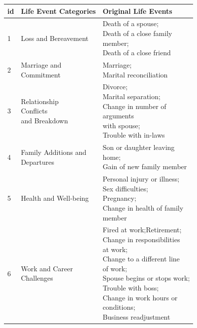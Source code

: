 \begin{table}[th]
    \small
    \centering
    \begin{tabular}{m{0.2cm}m{2.8cm}m{3.5cm}}
    \hline
    id & Life Event Categories & Original Life Events  \\ 
    \hline
    1 & Loss and Bereavement  &    \makecell[l]{Death of a spouse;\\Death of a close family \\member;\\Death of a close friend} \\ \hline
    2 & \makecell[l]{Marriage and \\Commitment}  &  \makecell[l]{Marriage;\\Marital reconciliation}   \\ \hline
    3 & \makecell[l]{Relationship \\ Conflicts \\and Breakdown}  &   \makecell[l]{Divorce;\\Marital separation;\\Change in number of\\ arguments \\with spouse;\\Trouble with in-laws}  \\ \hline
    4 & \makecell[l]{Family Additions and \\Departures}  &  \makecell[l]{Son or daughter leaving\\ home;\\Gain of new family member} \\ \hline
    5 & Health and Well-being  &  \makecell[l]{Personal injury or illness;\\Sex difficulties;\\Pregnancy;\\Change in health of family\\ member} \\ \hline
    6 & \makecell[l]{Work and Career\\ Challenges}  &  \makecell[l]{Fired at work;Retirement;\\Change in responsibilities\\ at work;\\Change to a different line \\of work;\\Spouse begins or stops work;\\Trouble with boss;\\Change in work hours or\\ conditions;\\Business readjustment }\\ \hline

\end{tabular}
\end{table}
